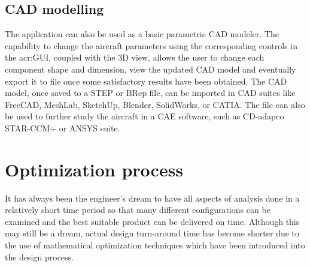 \subsection{CAD modelling}
The application can also be used as a basic parametric CAD modeler. The capability to change the aircraft parameters using the corresponding controls in the \gls{acr:GUI}, coupled with the 3D view, allows the user to change each component shape and dimension, view the updated CAD model and eventually export it to file once some satisfactory results have been obtained.
%
The CAD model, once saved to a STEP or BRep file, can be imported in CAD suites like FreeCAD, MeshLab, SketchUp, Blender, SolidWorks, or CATIA. The file can also be used to further study the aircraft in a CAE software, such as CD-adapco STAR-CCM+ or ANSYS suite.
%
\section{Optimization process}
It has always been the engineer’s dream to have all aspects of analysis done in a relatively short time period so that many different configurations can be examined and the best suitable product can be delivered on time. Although this may still be a dream, actual design turn-around time has become shorter due to the use of mathematical optimization techniques which have been introduced into the design process.\cite{torenbeek2013advanced}

